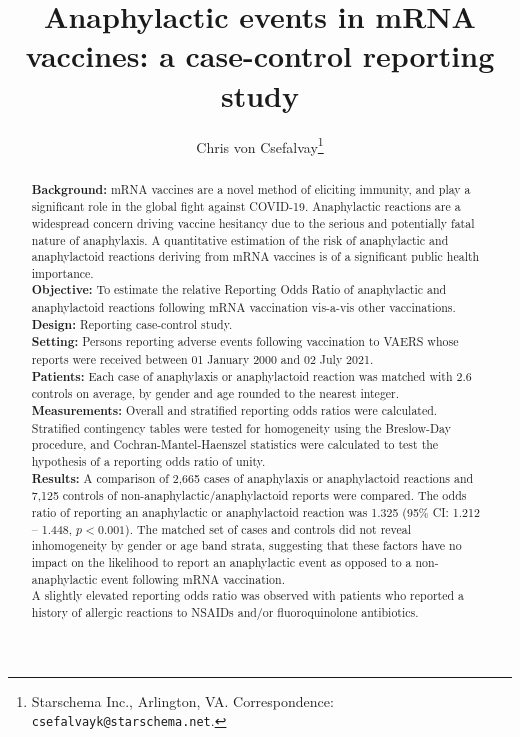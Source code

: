 \documentclass{article}
\title{Anaphylactic events in mRNA vaccines: a case-control reporting study}
\author{Chris von Csefalvay\thanks{Starschema Inc., Arlington, VA. Correspondence: \texttt{csefalvayk@starschema.net}.}}
\begin{document}
\maketitle

\onehalfspacing

\begin{abstract}
    \textbf{Background:}
        mRNA vaccines are a novel method of eliciting immunity, and play a significant role in the global fight against COVID-19.
        Anaphylactic reactions are a widespread concern driving vaccine hesitancy due to the serious and potentially fatal nature of anaphylaxis.
        A quantitative estimation of the risk of anaphylactic and anaphylactoid reactions deriving from mRNA vaccines is of a significant public health importance. \\
    \textbf{Objective:}
        To estimate the relative Reporting Odds Ratio of anaphylactic and anaphylactoid reactions following mRNA vaccination vis-a-vis other vaccinations. \\
    \textbf{Design:}
        Reporting case-control study. \\
    \textbf{Setting:}
        Persons reporting adverse events following vaccination to VAERS whose reports were received between 01 January 2000 and 02 July 2021. \\
    \textbf{Patients:}
        Each case of anaphylaxis or anaphylactoid reaction was matched with 2.6 controls on average, by gender and age rounded to the nearest integer. \\
    \textbf{Measurements:}
        Overall and stratified reporting odds ratios were calculated.
        Stratified contingency tables were tested for homogeneity using the Breslow-Day procedure, and Cochran-Mantel-Haenszel statistics were calculated to test the hypothesis of a reporting odds ratio of unity. \\
    \textbf{Results:}
        A comparison of 2,665 cases of anaphylaxis or anaphylactoid reactions and 7,125 controls of non-anaphylactic/anaphylactoid reports were compared.
        The odds ratio of reporting an anaphylactic or anaphylactoid reaction was 1.325 (95\% CI: 1.212 -- 1.448, $p < 0.001$).
        The matched set of cases and controls did not reveal inhomogeneity by gender or age band strata, suggesting that these factors have no impact on the likelihood to report an anaphylactic event as opposed to a non-anaphylactic event following mRNA vaccination. \\
        A slightly elevated reporting odds ratio was observed with patients who reported a history of allergic reactions to NSAIDs and/or fluoroquinolone antibiotics.

\end{abstract}
\end{document}
